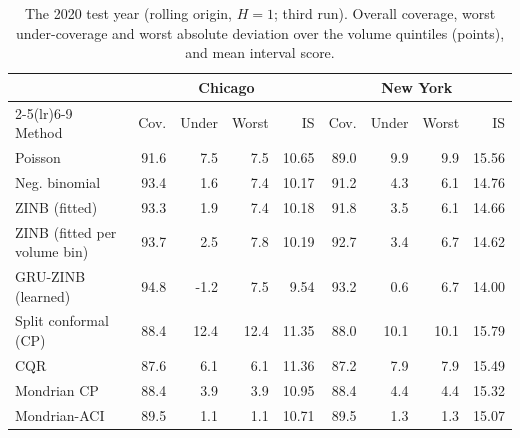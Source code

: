 \begin{table}[!htbp]\centering\scriptsize\setlength{\tabcolsep}{3.5pt}
\caption{The 2020 test year (rolling origin, $H=1$; third run). Overall coverage, worst under-coverage and worst absolute deviation over the volume quintiles (points), and mean interval score.}\label{tab:shift}
\begin{tabular}{lrrrrrrrr}\toprule
 & \multicolumn{4}{c}{Chicago} & \multicolumn{4}{c}{New York}\\\cmidrule(lr){2-5}\cmidrule(lr){6-9}
Method & Cov. & Under & Worst & IS & Cov. & Under & Worst & IS\\\midrule
Poisson & 91.6 & 7.5 & 7.5 & 10.65 & 89.0 & 9.9 & 9.9 & 15.56 \\
Neg. binomial & 93.4 & 1.6 & 7.4 & 10.17 & 91.2 & 4.3 & 6.1 & 14.76 \\
ZINB (fitted) & 93.3 & 1.9 & 7.4 & 10.18 & 91.8 & 3.5 & 6.1 & 14.66 \\
ZINB (fitted per volume bin) & 93.7 & 2.5 & 7.8 & 10.19 & 92.7 & 3.4 & 6.7 & 14.62 \\
GRU-ZINB (learned) & 94.8 & -1.2 & 7.5 & 9.54 & 93.2 & 0.6 & 6.7 & 14.00 \\
Split conformal (CP) & 88.4 & 12.4 & 12.4 & 11.35 & 88.0 & 10.1 & 10.1 & 15.79 \\
CQR & 87.6 & 6.1 & 6.1 & 11.36 & 87.2 & 7.9 & 7.9 & 15.49 \\
Mondrian CP & 88.4 & 3.9 & 3.9 & 10.95 & 88.4 & 4.4 & 4.4 & 15.32 \\
Mondrian-ACI & 89.5 & 1.1 & 1.1 & 10.71 & 89.5 & 1.3 & 1.3 & 15.07 \\
\bottomrule\end{tabular}\end{table}
